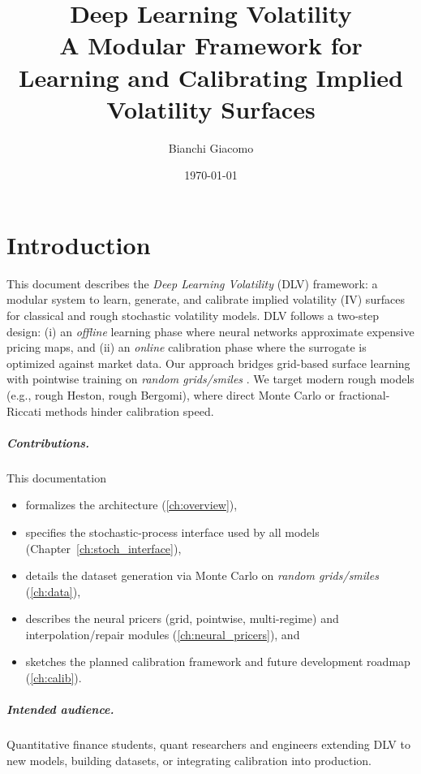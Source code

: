 \title{Deep Learning Volatility\\\large A Modular Framework for Learning and Calibrating Implied Volatility Surfaces}
\author{Bianchi Giacomo}
\date{\today}


	\maketitle
	\tableofcontents
	
	\chapter{Introduction}
	\label{ch:intro}
	This document describes the \emph{Deep Learning Volatility} (DLV) framework: a modular system to learn, generate, and calibrate implied volatility (IV) surfaces for classical and rough stochastic volatility models. DLV follows a two-step design: (i) an \emph{offline} learning phase where neural networks approximate expensive pricing maps, and (ii) an \emph{online} calibration phase where the surrogate is optimized against market data. Our approach bridges grid-based surface learning \citep{Horvath2021DLV} with pointwise training on \emph{random grids/smiles} \citep{Baschetti2024DeepCalibrationRandomGrids}. We target modern rough models (e.g., rough Heston, rough Bergomi), where direct Monte Carlo or fractional-Riccati methods hinder calibration speed.
	
	\paragraph{Contributions.} This documentation
	\begin{itemize}[nosep]
		\item formalizes the architecture (\cref{ch:overview}),
		\item specifies the stochastic-process interface used by all models (Chapter~\ref{ch:stoch_interface}),
		\item details the dataset generation via Monte Carlo on \emph{random grids/smiles} (\cref{ch:data}),
		\item describes the neural pricers (grid, pointwise, multi-regime) and interpolation/repair modules (\cref{ch:neural_pricers}), and
		\item sketches the planned calibration framework and future development roadmap (\cref{ch:calib}).
	\end{itemize}
	
	\paragraph{Intended audience.} Quantitative finance students, quant researchers and engineers extending DLV to new models, building datasets, or integrating calibration into production.
	
